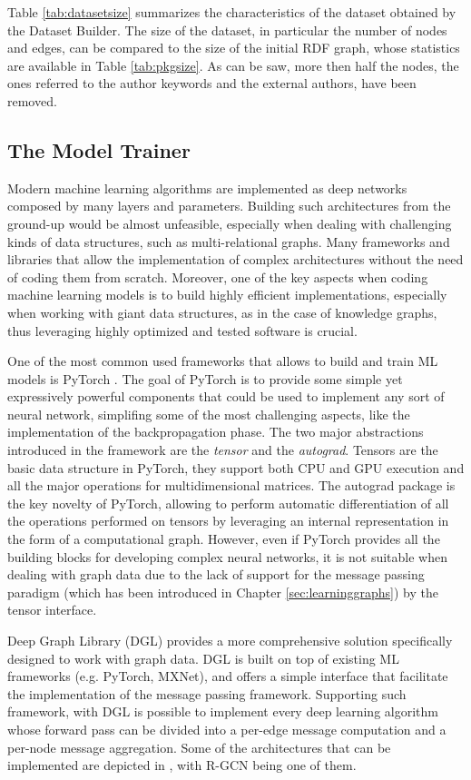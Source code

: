 \documentclass[%
    corpo=13.5pt,
    twoside,
    oldstyle,
    tipotesi=magistrale,
    greek,
    evenboxes
]{toptesi}
\begin{document}
Table \ref{tab:datasetsize} summarizes the characteristics of the
dataset obtained by the Dataset Builder.
The size of the dataset, in particular the number of nodes and edges,
can be compared to the size of the initial RDF graph, whose statistics are
available in Table \ref{tab:pkgsize}.
As can be saw, more then half the nodes, the ones referred to the
author keywords and the external authors, have been removed.


\subsection{The Model Trainer}

Modern machine learning algorithms are implemented as deep networks
composed by many layers and parameters. Building such architectures from the
ground-up would be almost unfeasible, especially when dealing with challenging
kinds of data structures, such as multi-relational graphs.
Many frameworks and libraries that allow the implementation of complex
architectures without the need of coding them from scratch. Moreover, one
of the key aspects when coding machine learning models is to build highly
efficient implementations, especially when working with giant data structures,
as in the case of knowledge graphs, thus leveraging highly optimized and tested
software is crucial.

One of the most common used frameworks that allows to build and train
ML models is PyTorch \cite{paszke2017}. The goal of PyTorch is to provide
some simple yet expressively powerful components that could be used to implement
any sort of neural network, simplifing some of the most challenging aspects,
like the implementation of the backpropagation phase.
The two major abstractions introduced in the framework are the \emph{tensor}
and the \emph{autograd}.
Tensors are the basic data structure in PyTorch, they support both CPU and GPU
execution and all the major operations for multidimensional matrices.
The autograd package is the key novelty of PyTorch, allowing to perform
automatic differentiation of all the operations performed on tensors by
leveraging an internal representation in the form of a computational graph.
However, even if PyTorch provides all the building blocks for
developing complex neural networks, it is not suitable when dealing with graph
data due to the lack of support for the message passing paradigm (which has been
introduced in Chapter \ref{sec:learninggraphs}) by the
tensor interface.

Deep Graph Library \cite{wang2019} (DGL) provides a more comprehensive
solution specifically designed to work with graph data. DGL is built on top of
existing ML frameworks (e.g. PyTorch, MXNet), and offers a simple
interface that facilitate the implementation of the message passing framework.
Supporting such framework, with DGL is possible to implement every deep learning
algorithm whose forward pass can be divided into a per-edge message computation
and a per-node message aggregation.
Some of the architectures that can be implemented
are depicted in \cite{gilmer2017}, with R-GCN being one of them.
\end{document}
